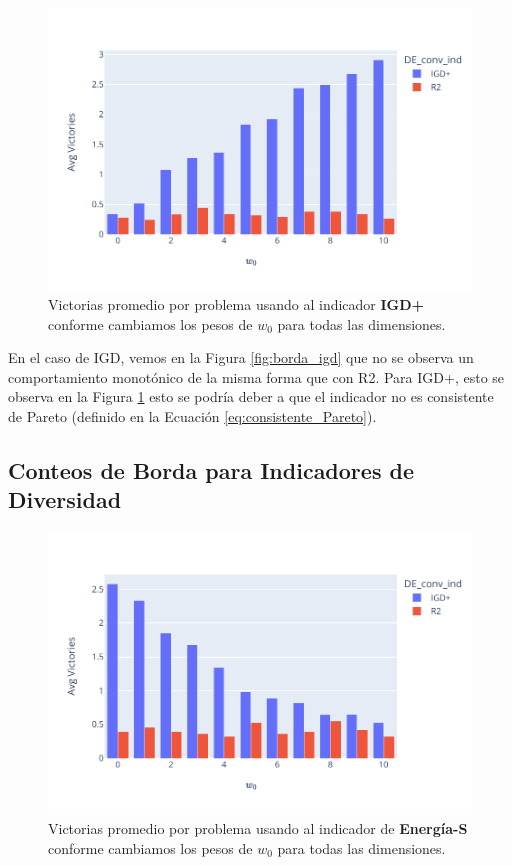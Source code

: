 \begin{figure} [H]
    \centering
\includegraphics[width=\textwidth]{Figuras/borda_obj_ind_igd+.pdf}
\caption[Conteo de borda IGD+]{Victorias promedio por problema usando al indicador \textbf{IGD+} conforme cambiamos los pesos de $w_0$ para todas las dimensiones.}
\label{fig:borda_igdp}
\end{figure}

En el caso de IGD, vemos en la Figura \ref{fig:borda_igd} que no se observa un comportamiento monotónico de la misma forma que con R2. Para IGD+, esto se observa en la Figura \ref{fig:borda_igdp} esto se podría deber a que el indicador no es consistente de Pareto (definido en la Ecuación \ref{eq:consistente_Pareto}).


\subsection*{Conteos de Borda para Indicadores de Diversidad}

\begin{figure} [H]
    \centering
    \includegraphics[width=\textwidth]{Figuras/borda_obj_ind_s-energy.pdf}
    \caption[Conteo de borda IGD+]{Victorias promedio por problema usando al indicador de \textbf{Energía-S} conforme cambiamos los pesos de $w_0$ para todas las dimensiones.}
    \label{fig:borda_senergy}
\end{figure}

